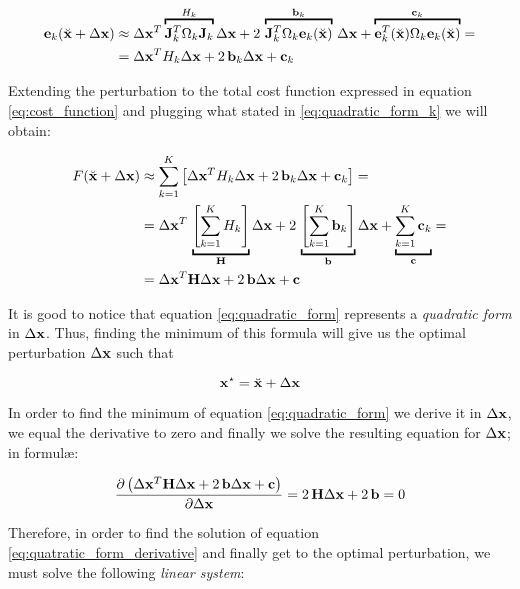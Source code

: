 \begin{align}
    \error_k(\linstate + \dx) &\approx \dx^T\overbracket{\jacob_k^T\Omega_k\jacob_k}^{H_k}\dx + 2\,\overbracket{\jacob_k^T\Omega_k\error_k(\linstate)}^{\mathbf{b}_k}\,\dx + \overbracket{\error_k^T(\linstate)\Omega_k\error_k(\linstate)}^{\mathbf{c}_k} =\nonumber\\
    &= \dx^TH_k\dx + 2\,\mathbf{b}_k\dx + \mathbf{c}_k
    \label{eq:quadratic_form_k}
\end{align}

Extending the perturbation to the total cost function expressed in equation \ref{eq:cost_function} and plugging what stated in \ref{eq:quadratic_form_k} we will obtain:

\begin{align}
    F(\linstate + \dx) &\approx \sum_{k = 1}^{K} \left[\dx^TH_k\dx + 2\,\mathbf{b}_k\dx + \mathbf{c}_k\right] =\nonumber\\
    &= \dx^T\,\underbracket{\left[\sum_{k = 1}^KH_k\right]}_{\hessian}\dx + 2\,\underbracket{\left[\sum_{k = 1}^K\mathbf{b}_k\right]}_{\mathbf{b}}\dx + \underbracket{\sum_{k = 1}^K\mathbf{c}_k}_{\mathbf{c}} \nonumber = \\
    &= \dx^T\hessian\dx + 2\,\mathbf{b}\dx + \mathbf{c}
    \label{eq:quadratic_form}
\end{align}

It is good to notice that equation \ref{eq:quadratic_form} represents a \textit{quadratic form} in $\Delta \mathbf{x}$. Thus, finding the minimum of this formula will give us the optimal perturbation $\Delta \mathbf{x}$ such that

\begin{equation*}
    \mathbf{x}^\star = \breve{\mathbf{x}} + \Delta \mathbf{x}
\end{equation*}

\noindent In order to find the minimum of equation \ref{eq:quadratic_form} we derive it in $\Delta \mathbf{x}$, we equal the derivative to zero and finally we solve the resulting equation for $\Delta \mathbf{x}$; in formul\ae:

\begin{equation}
    \frac{\partial\left(\Delta \mathbf{x}^T\mathbf{H}\Delta \mathbf{x} + 2\,\mathbf{b}\Delta \mathbf{x} + \mathbf{c}\right)}{\partial \Delta \mathbf{x}} = 2\,\mathbf{H}\Delta \mathbf{x} + 2\,\mathbf{b} = 0
    \label{eq:quatratic_form_derivative}
\end{equation}

\noindent Therefore, in order to find the solution of equation \ref{eq:quatratic_form_derivative} and finally get to the optimal perturbation, we must solve the following \textit{linear system}:

